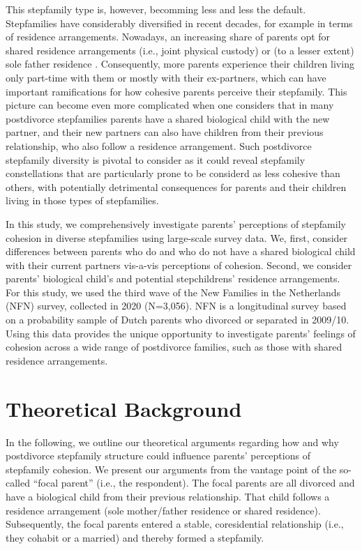 \documentclass[\pandocDocMode,longtable,floatsintext]{apa6}
\begin{document}
This stepfamily type is, however, becomming less and less the default.
Stepfamilies have considerably diversified in recent decades, for
example in terms of residence arrangements. Nowadays, an increasing
share of parents opt for shared residence arrangements (i.e., joint
physical custody) or (to a lesser extent) sole father residence
\autocite{poortman2017shared}. Consequently, more parents experience
their children living only part-time with them or mostly with their
ex-partners, which can have important ramifications for how cohesive
parents perceive their stepfamily. This picture can become even more
complicated when one considers that in many postdivorce stepfamilies
parents have a shared biological child with the new partner, and their
new partners can also have children from their previous relationship,
who also follow a residence arrangement. Such postdivorce stepfamily
diversity is pivotal to consider as it could reveal stepfamily
constellations that are particularly prone to be considerd as less
cohesive than others, with potentially detrimental consequences for
parents and their children living in those types of stepfamilies.

In this study, we comprehensively investigate parents' perceptions of
stepfamily cohesion in diverse stepfamilies using large-scale survey
data. We, first, consider differences between parents who do and who do
not have a shared biological child with their current partners vis-a-vis
perceptions of cohesion. Second, we consider parents' biological child's
and potential stepchildrens' residence arrangements. For this study, we
used the third wave of the New Families in the Netherlands (NFN) survey,
collected in 2020 (N=3,056). NFN is a longitudinal survey based on a
probability sample of Dutch parents who divorced or separated in
2009/10. Using this data provides the unique opportunity to investigate
parents' feelings of cohesion across a wide range of postdivorce
families, such as those with shared residence arrangements.

\hypertarget{theoretical-background}{%
\section{Theoretical Background}\label{theoretical-background}}

In the following, we outline our theoretical arguments regarding how and
why postdivorce stepfamily structure could influence parents'
perceptions of stepfamily cohesion. We present our arguments from the
vantage point of the so-called ``focal parent'' (i.e., the respondent).
The focal parents are all divorced and have a biological child from
their previous relationship. That child follows a residence arrangement
(sole mother/father residence or shared residence). Subsequently, the
focal parents entered a stable, coresidential relationship (i.e., they
cohabit or a married) and thereby formed a stepfamily.
\end{document}
